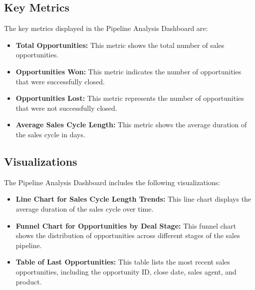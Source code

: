 \documentclass{article}
\begin{document}
\subsection{Key Metrics}
The key metrics displayed in the Pipeline Analysis Dashboard are:
\begin{itemize}
    \item \textbf{Total Opportunities:} This metric shows the total number of sales opportunities.
    \item \textbf{Opportunities Won:} This metric indicates the number of opportunities that were successfully closed.
    \item \textbf{Opportunities Lost:} This metric represents the number of opportunities that were not successfully closed.
    \item \textbf{Average Sales Cycle Length:} This metric shows the average duration of the sales cycle in days.
\end{itemize}

\subsection{Visualizations}
The Pipeline Analysis Dashboard includes the following visualizations:
\begin{itemize}
    \item \textbf{Line Chart for Sales Cycle Length Trends:} This line chart displays the average duration of the sales cycle over time.
    \item \textbf{Funnel Chart for Opportunities by Deal Stage:} This funnel chart shows the distribution of opportunities across different stages of the sales pipeline.
    \item \textbf{Table of Last Opportunities:} This table lists the most recent sales opportunities, including the opportunity ID, close date, sales agent, and product.
\end{itemize}
\end{document}
